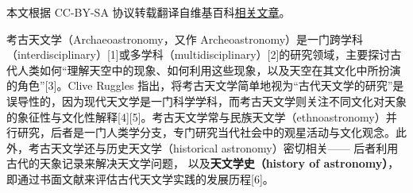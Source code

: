 
本文根据 CC-BY-SA 协议转载翻译自维基百科\href{https://en.wikipedia.org/wiki/Archaeoastronomy}{相关文章}。


考古天文学（Archaeoastronomy，又作 Archeoastronomy）是一门跨学科（interdisciplinary）[1]或多学科（multidisciplinary）[2]的研究领域，主要探讨古代人类如何“理解天空中的现象、如何利用这些现象，以及天空在其文化中所扮演的角色”[3]。Clive Ruggles 指出，将考古天文学简单地视为“古代天文学的研究”是误导性的，因为现代天文学是一门科学学科，而考古天文学则关注不同文化对天象的象征性与文化性解释[4][5]。考古天文学常与民族天文学（ethnoastronomy）并行研究，后者是一门人类学分支，专门研究当代社会中的观星活动与文化观念。此外，考古天文学还与历史天文学（historical astronomy）密切相关——  
后者利用古代的天象记录来解决天文学问题，  
以及\textbf{天文学史（history of astronomy）}，  
即通过书面文献来评估古代天文学实践的发展历程[6]。
